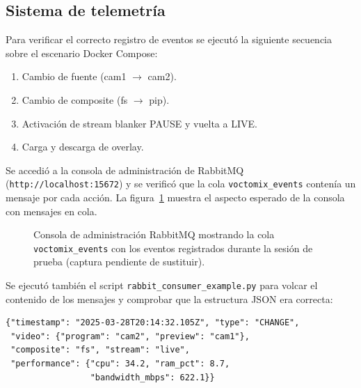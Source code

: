 \subsection{Sistema de telemetría}
\label{sec:prueba_telemetria}

Para verificar el correcto registro de eventos se ejecutó la siguiente secuencia
sobre el escenario Docker Compose:

\begin{enumerate}
  \item Cambio de fuente (cam1 $\rightarrow$ cam2).
  \item Cambio de composite (fs $\rightarrow$ pip).
  \item Activación de stream blanker PAUSE y vuelta a LIVE.
  \item Carga y descarga de overlay.
\end{enumerate}

Se accedió a la consola de administración de RabbitMQ
(\texttt{http://localhost:15672}) y se verificó que la cola \texttt{voctomix\_events}
contenía un mensaje por cada acción. La figura~\ref{fig:rabbitmq_placeholder}
muestra el aspecto esperado de la consola con mensajes en cola.

\begin{figure}[H]
  \centering
  \caption{Consola de administración RabbitMQ mostrando la cola
           \texttt{voctomix\_events} con los eventos registrados durante
           la sesión de prueba (captura pendiente de sustituir).}
  \label{fig:rabbitmq_placeholder}
\end{figure}

Se ejecutó también el script \texttt{rabbit\_consumer\_example.py} para volcar el
contenido de los mensajes y comprobar que la estructura JSON era correcta:

\begin{verbatim}
{"timestamp": "2025-03-28T20:14:32.105Z", "type": "CHANGE",
 "video": {"program": "cam2", "preview": "cam1"},
 "composite": "fs", "stream": "live",
 "performance": {"cpu": 34.2, "ram_pct": 8.7,
                 "bandwidth_mbps": 622.1}}
\end{verbatim}

